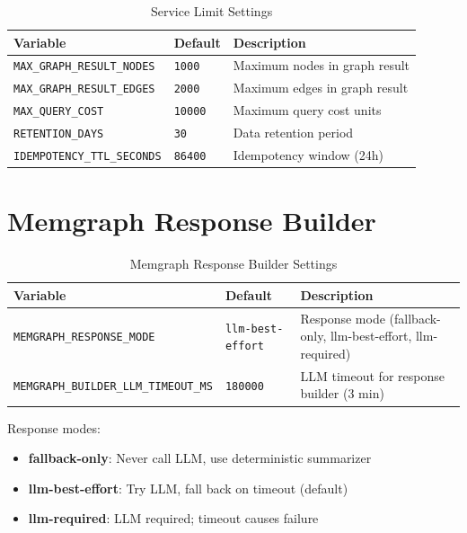 \begin{table}[ht]
\centering
\caption{Service Limit Settings}
\label{tab:config-limits}
\small
\begin{tabularx}{\textwidth}{llX}
    \hline
    \textbf{Variable} & \textbf{Default} & \textbf{Description} \\
    \hline
    \texttt{MAX\_GRAPH\_RESULT\_NODES} & \texttt{1000} & Maximum nodes in graph result \\
    \texttt{MAX\_GRAPH\_RESULT\_EDGES} & \texttt{2000} & Maximum edges in graph result \\
    \texttt{MAX\_QUERY\_COST} & \texttt{10000} & Maximum query cost units \\
    \texttt{RETENTION\_DAYS} & \texttt{30} & Data retention period \\
    \texttt{IDEMPOTENCY\_TTL\_SECONDS} & \texttt{86400} & Idempotency window (24h) \\
    \hline
\end{tabularx}
\end{table}

\section{Memgraph Response Builder}
\label{app:config:memgraph-response}

\begin{table}[ht]
\centering
\caption{Memgraph Response Builder Settings}
\label{tab:config-memgraph-response}
\small
\begin{tabularx}{\textwidth}{llX}
    \hline
    \textbf{Variable} & \textbf{Default} & \textbf{Description} \\
    \hline
    \texttt{MEMGRAPH\_RESPONSE\_MODE} & \texttt{llm-best-effort} & Response mode (fallback-only, llm-best-effort, llm-required) \\
    \texttt{MEMGRAPH\_BUILDER\_LLM\_TIMEOUT\_MS} & \texttt{180000} & LLM timeout for response builder (3 min) \\
    \hline
\end{tabularx}
\end{table}

Response modes:
\begin{itemize}
    \item \textbf{fallback-only}: Never call LLM, use deterministic summarizer
    \item \textbf{llm-best-effort}: Try LLM, fall back on timeout (default)
    \item \textbf{llm-required}: LLM required; timeout causes failure
\end{itemize}

